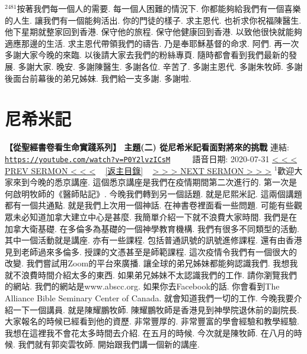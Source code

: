 \documentclass{book}
\begin{document}
$^{2481}$按著我們每一個人的需要.
每一個人困難的情況下.
你都能夠給我們有一個喜樂的人生.
讓我們有一個能夠活出.
你的門徒的樣子.
求主恩代.
也祈求你祝福陳醫生.
他下星期就整家回到香港.
保守他的旅程.
保守他健康回到香港.
以致他很快就能夠適應那邊的生活.
求主恩代帶領我們的禱告.
乃是奉耶穌基督的命求.
阿們.
再一次多謝大家今晚的來臨.
以後請大家去我們的粉絲專頁.
隨時都會看到我們最新的發展.
多謝大家.
晚安.
多謝陳醫生.
多謝各位.
辛苦了.
多謝主恩代.
多謝朱牧師.
多謝後面台前幕後的弟兄姊妹.
我們給一支多謝.
多謝啦.
\newpage



\section{尼希米記}
\label{sec:P0Y2lvzICsM}
\textbf{【從聖經書卷看生命實踐系列】 主題(二) 從尼希米記看面對將來的挑戰}
\newline
\newline
連結: \href{https://youtube.com/watch?v=P0Y2lvzICsM}{\texttt{https://youtube.com/watch?v=P0Y2lvzICsM}} ~~~~ 語音日期: 2020-07-31
\newline
\newline
\hyperref[sec:yb30yQHiYdM]{\small{< < < PREV SERMON < < <}}
~
\hyperref[sec:index]{\small{[返主目錄]}}
~
\hyperref[sec:XLKUZGl9ItY]{\small{> > > NEXT SERMON > > >}}
\newline
\newline
$^{1}$歡迎大家來到今晚的悉京講座.
這個悉京講座是我們在疫情期間第二次進行的.
第一次是何啟明牧師的《醫師貼記》.
今晚我們轉到另一個話題.
就是尼熙米記.
這兩個講題都有一個共通點.
就是我們上次用一個神話.
在神書卷裡面看一些問題.
可能有些觀眾未必知道加拿大建立中心是甚麼.
我簡單介紹一下就不浪費大家時間.
我們是在加拿大衛基礎.
在多倫多為基礎的一個神學教育機構.
我們有很多不同類型的活動.
其中一個活動就是講座.
亦有一些課程.
包括普通訊號的訊號進修課程.
還有由香港見到老師過來多倫多.
授課的文憑甚至是師範課程.
這次疫情令我們有一個很大的改變.
我們嘗試用Zoom的平台來廣播.
讓全球的弟兄姊妹都能夠認識我們.
我想我就不浪費時間介紹太多的東西.
如果弟兄姊妹不太認識我們的工作.
請你瀏覽我們的網站.
我們的網站是www.abscc.org.
如果你去Facebook的話.
你會看到The Alliance Bible Seminary Center of Canada.
就會知道我們一切的工作.
今晚我要介紹一下一個講員.
就是陳耀鵬牧師.
陳耀鵬牧師是香港見到神學院退休前的副院長.
大家報名的時候已經看到他的資歷.
非常豐厚的.
非常豐富的學會經驗和教學經驗.
我想在這裡我不會花太多時間去介紹.
在五月的時候.
今次就是陳牧師.
在八月的時候.
我們就有郭奕雲牧師.
開始跟我們講一個新的講座.
\end{document}
